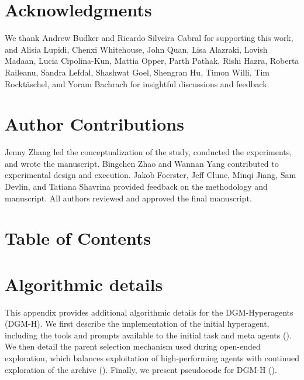 \documentclass[]{fairmeta}
\providecommand{\DIFaddtex}[1]{{\protect\color{blue}\uwave{#1}}} %
\providecommand{\DIFaddbegin}{} %
\providecommand{\DIFaddend}{} %
\providecommand{\DIFadd}[1]{\texorpdfstring{\DIFaddtex{#1}}{#1}} %
\begin{document}
\section*{Acknowledgments}
We thank Andrew Budker and Ricardo Silveira Cabral for supporting this work, and Alisia Lupidi, Chenxi Whitehouse, John Quan, Lisa Alazraki, Lovish Madaan, Lucia Cipolina-Kun, Mattia Opper, \DIFaddbegin \DIFadd{Michael Dennis, }\DIFaddend Parth Pathak, Rishi Hazra, Roberta Raileanu, Sandra Lefdal, Shashwat Goel, Shengran Hu, Timon Willi, Tim Rockt\"aschel, and Yoram Bachrach for insightful discussions and feedback.

\section*{Author Contributions}
Jenny Zhang led the conceptualization of the study, conducted the experiments, and wrote the manuscript. Bingchen Zhao and Wannan Yang contributed to experimental design and execution. Jakob Foerster, Jeff Clune, Minqi Jiang, Sam Devlin, and Tatiana Shavrina provided feedback on the methodology and manuscript. All authors reviewed and approved the final manuscript.




\clearpage

\beginappendix

\section*{Table of Contents}
\startcontents[sections]
\clearpage


\section{Algorithmic details}
\label{app:algo-details}

This appendix provides additional algorithmic details for the DGM-Hyperagents (DGM-H). We first describe the implementation of the initial hyperagent, including the tools and prompts available to the initial task and meta agents (). We then detail the parent selection mechanism used during open-ended exploration, which balances exploitation of high-performing agents with continued exploration of the archive (). Finally, we present pseudocode for DGM-H ().
\end{document}
